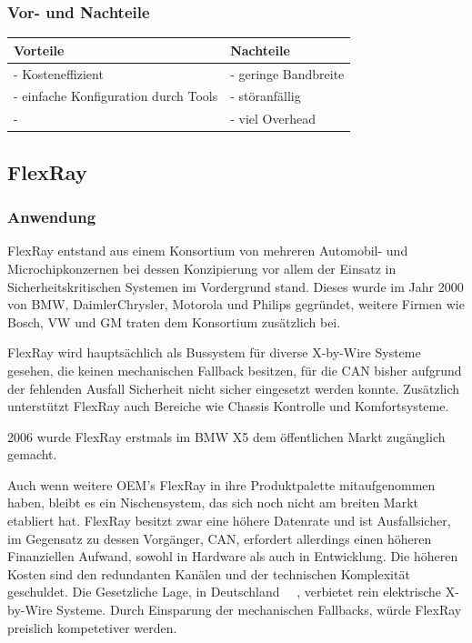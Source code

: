     \subsubsection{Vor- und Nachteile}

    \begin{center}
        \begin{tabular}{p{5.5cm} p{5.5cm}}
            \hline
            Vorteile & Nachteile\\
            \hline
            \hline - Kosteneffizient & - geringe Bandbreite\\
            \hline - einfache Konfiguration durch Tools & - störanfällig\\
            \hline - & - viel Overhead\\
            \hline
        \end{tabular}            
    \end{center}

\subsection{FlexRay}
    \subsubsection{Anwendung}
    FlexRay entstand aus einem Konsortium von mehreren Automobil- und Microchipkonzernen bei
    dessen Konzipierung vor allem der Einsatz in Sicherheitskritischen Systemen im Vordergrund 
    stand. Dieses wurde im Jahr 2000 von BMW, DaimlerChrysler, Motorola und Philips gegründet,
    weitere Firmen wie Bosch, VW und GM traten dem Konsortium zusätzlich bei.

    FlexRay wird hauptsächlich als Bussystem für diverse X-by-Wire Systeme gesehen, die keinen 
    mechanischen Fallback besitzen, für die CAN bisher aufgrund der fehlenden Ausfall Sicherheit 
    nicht sicher eingesetzt werden konnte. Zusätzlich unterstützt FlexRay auch Bereiche wie Chassis
    Kontrolle und Komfortsysteme. 

    2006 wurde FlexRay erstmals im BMW X5 dem öffentlichen Markt zugänglich gemacht.
    ~\cite{reif2011bosch}

    Auch wenn weitere OEM’s FlexRay in ihre Produktpalette mitaufgenommen haben, bleibt es
    ein Nischensystem, das sich noch nicht am breiten Markt etabliert hat. FlexRay besitzt zwar eine
    höhere Datenrate und ist Ausfallsicher, im Gegensatz zu dessen Vorgänger, CAN, erfordert 
    allerdings einen höheren Finanziellen Aufwand, sowohl in Hardware als auch in Entwicklung.
    Die höheren Kosten sind den redundanten Kanälen und der technischen Komplexität geschuldet.
    Die Gesetzliche Lage, in Deutschland~\cite{LA_StVZO38}~\cite{LA_StVZO41}
    , verbietet rein elektrische X-by-Wire Systeme. Durch 
    Einsparung der mechanischen Fallbacks, würde FlexRay preislich kompetetiver werden.
    ~\cite{LA_FR1}
    ~\cite{LA_FR2}
    ~\cite{LA_FR3}
    ~\cite{LA_FR4}
    
